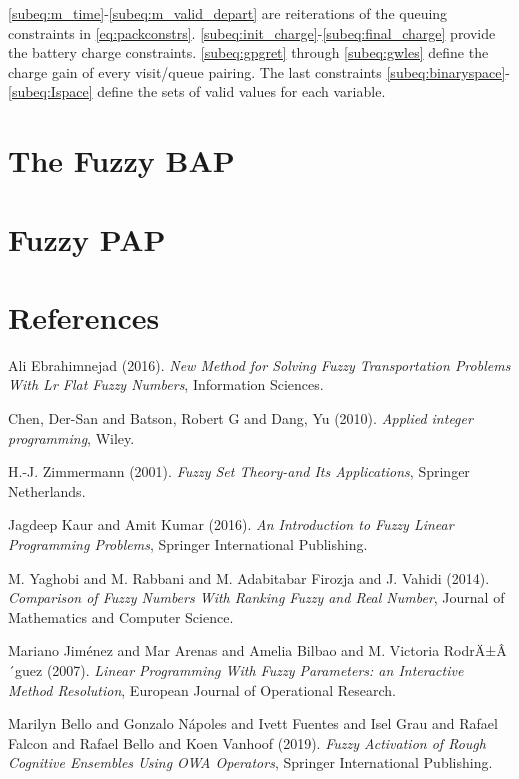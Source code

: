 \documentclass[11pt,a4paper,final]{article}
\begin{document}
\autoref{subeq:m_time}-\autoref{subeq:m_valid_depart} are reiterations of the queuing constraints in
\autoref{eq:packconstrs}. \autoref{subeq:init_charge}-\autoref{subeq:final_charge} provide the battery charge
constraints. \autoref{subeq:gpgret} through \autoref{subeq:gwles} define the charge gain of every visit/queue
pairing. The last constraints \autoref{subeq:binaryspace}-\autoref{subeq:Ispace} define the sets of valid values for each
variable.

\section{The Fuzzy BAP}
\label{sec:org30564fa}

\section{Fuzzy PAP}
\label{sec:org36f73b8}

\section{References}
\label{sec:orgee2d802}
\noindent
Ali Ebrahimnejad (2016). \emph{New Method for Solving Fuzzy Transportation Problems With Lr Flat Fuzzy Numbers}, Information Sciences.

\noindent
Chen, Der-San and Batson, Robert G and Dang, Yu (2010). \emph{Applied integer programming}, Wiley.

\noindent
H.-J. Zimmermann (2001). \emph{Fuzzy Set Theory-and Its Applications}, Springer Netherlands.

\noindent
Jagdeep Kaur and Amit Kumar (2016). \emph{An Introduction to Fuzzy Linear Programming Problems}, Springer International Publishing.

\noindent
M. Yaghobi and M. Rabbani and M. Adabitabar Firozja and J. Vahidi (2014). \emph{Comparison of Fuzzy Numbers With Ranking Fuzzy and Real Number}, Journal of Mathematics and Computer Science.

\noindent
Mariano Jim{\'e}nez and Mar Arenas and Amelia Bilbao and M. Victoria RodrÄ±Â´guez (2007). \emph{Linear Programming With Fuzzy Parameters: an Interactive Method Resolution}, European Journal of Operational Research.

\noindent
Marilyn Bello and Gonzalo N{\'a}poles and Ivett Fuentes and Isel Grau and Rafael Falcon and Rafael Bello and Koen Vanhoof (2019). \emph{Fuzzy Activation of Rough Cognitive Ensembles Using OWA Operators}, Springer International Publishing.
\end{document}
